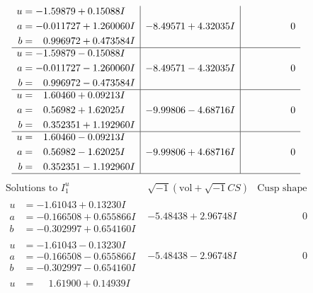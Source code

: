 \documentclass[1p]{elsarticle_modified}
\theoremstyle{definition}
\newcommand{\I}{\sqrt{-1}}
\begin{document}
$$\begin{array}{c|c|c}
\begin{aligned}
u &= -1.59879 + 0.15088 I \\
a &= -0.011727 + 1.260060 I \\
b &= \phantom{-}0.996972 + 0.473584 I\end{aligned}
 & -8.49571 + 4.32035 I & \phantom{-0.000000 } 0 \\ \hline\begin{aligned}
u &= -1.59879 - 0.15088 I \\
a &= -0.011727 - 1.260060 I \\
b &= \phantom{-}0.996972 - 0.473584 I\end{aligned}
 & -8.49571 - 4.32035 I & \phantom{-0.000000 } 0 \\ \hline\begin{aligned}
u &= \phantom{-}1.60460 + 0.09213 I \\
a &= \phantom{-}0.56982 + 1.62025 I \\
b &= \phantom{-}0.352351 + 1.192960 I\end{aligned}
 & -9.99806 - 4.68716 I & \phantom{-0.000000 } 0 \\ \hline\begin{aligned}
u &= \phantom{-}1.60460 - 0.09213 I \\
a &= \phantom{-}0.56982 - 1.62025 I \\
b &= \phantom{-}0.352351 - 1.192960 I\end{aligned}
 & -9.99806 + 4.68716 I & \phantom{-0.000000 } 0\\
 \hline 
 \end{array}$$\newpage$$\begin{array}{c|c|c}  
\text{Solutions to }I^u_{1}& \I (\text{vol} + \sqrt{-1}CS) & \text{Cusp shape}\\
 \hline 
\begin{aligned}
u &= -1.61043 + 0.13230 I \\
a &= -0.166508 + 0.655866 I \\
b &= -0.302997 + 0.654160 I\end{aligned}
 & -5.48438 + 2.96748 I & \phantom{-0.000000 } 0 \\ \hline\begin{aligned}
u &= -1.61043 - 0.13230 I \\
a &= -0.166508 - 0.655866 I \\
b &= -0.302997 - 0.654160 I\end{aligned}
 & -5.48438 - 2.96748 I & \phantom{-0.000000 } 0 \\ \hline\begin{aligned}
u &= \phantom{-}1.61900 + 0.14939 I \\

\end{aligned}
\end{array}$$
\end{document}
